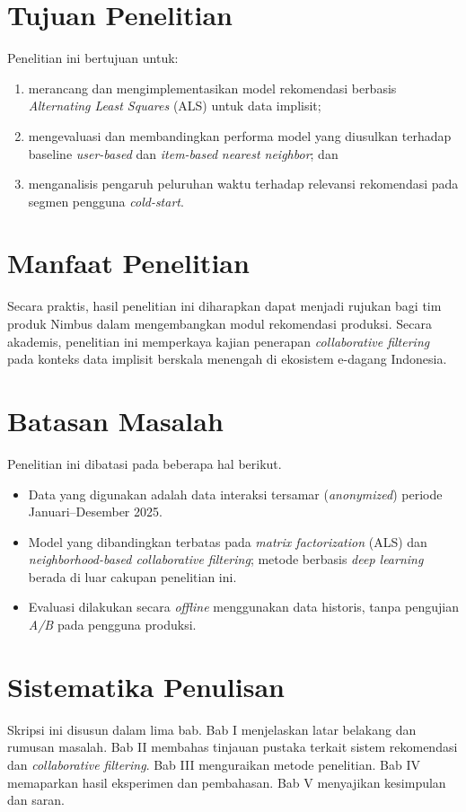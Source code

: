 \documentclass[12pt,a4paper]{report}
\begin{document}
\begin{onehalfspace}
\section{Tujuan Penelitian}
Penelitian ini bertujuan untuk:
\begin{enumerate}
  \item merancang dan mengimplementasikan model rekomendasi berbasis
    \emph{Alternating Least Squares} (ALS) untuk data implisit;
  \item mengevaluasi dan membandingkan performa model yang diusulkan
    terhadap baseline \emph{user-based} dan \emph{item-based} \emph{nearest
    neighbor}; dan
  \item menganalisis pengaruh peluruhan waktu terhadap relevansi
    rekomendasi pada segmen pengguna \emph{cold-start}.
\end{enumerate}

\section{Manfaat Penelitian}
Secara praktis, hasil penelitian ini diharapkan dapat menjadi rujukan bagi
tim produk Nimbus dalam mengembangkan modul rekomendasi produksi. Secara
akademis, penelitian ini memperkaya kajian penerapan \emph{collaborative
filtering} pada konteks data implisit berskala menengah di ekosistem
e-dagang Indonesia.

\section{Batasan Masalah}
Penelitian ini dibatasi pada beberapa hal berikut.
\begin{itemize}
  \item Data yang digunakan adalah data interaksi tersamar (\emph{anonymized})
    periode Januari--Desember 2025.
  \item Model yang dibandingkan terbatas pada \emph{matrix factorization}
    (ALS) dan \emph{neighborhood-based collaborative filtering}; metode
    berbasis \emph{deep learning} berada di luar cakupan penelitian ini.
  \item Evaluasi dilakukan secara \emph{offline} menggunakan data historis,
    tanpa pengujian \emph{A/B} pada pengguna produksi.
\end{itemize}

\section{Sistematika Penulisan}
Skripsi ini disusun dalam lima bab. Bab I menjelaskan latar belakang dan
rumusan masalah. Bab II membahas tinjauan pustaka terkait sistem
rekomendasi dan \emph{collaborative filtering}. Bab III menguraikan metode
penelitian. Bab IV memaparkan hasil eksperimen dan pembahasan. Bab V
menyajikan kesimpulan dan saran.


\end{onehalfspace}
\end{document}
